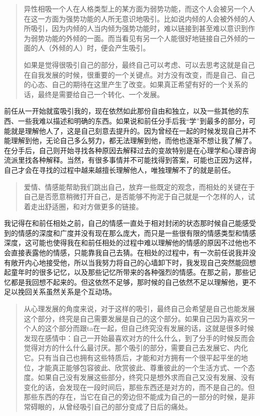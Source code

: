 \blockquote{
	异性相吸\pozhehao{}一个人在人格类型上的某方面为弱势功能，而这个人会被另一个人在这一方面为强势功能的人所无意识地吸引。比如说内倾的人会被外倾的人所吸引，因为内倾的人当内倾为强势功能时，难以链接到甚至难以意识到作为弱势功能的外倾的一面。而当看见有另一个人能很好地链接自己外倾的一面的人（外倾的人）时，便会产生吸引。

	如果是觉得很吸引自己的部分，最终自己可以考虑、可以去思考这就是自己在自我发展的时候，很重要的一个关键点。对方没有改变，而是自己、自己的心态、自己的期待在这里产生了改变。如果真正希望有好的一个关系的话，最终是需要给自己一个转化、一个发展。

}

前任从一开始就蛮吸引我的，现在依然如此\pozhehao{}那份自由和独立，以及一些其他的东西、一些我难以描述和明确的东西。如果说和前任分手后我“学”到最多的部分，可能就是理解他人了，这是自己刻意去提升的。因为曾经在一起的时候发现自己并不能理解到他，无论自己多么努力，都无法理解到他，而他也逐渐不想让我了解了。在分手后，自己则开始寻找各种原因去解释过去的变故\pozhehao{}特别是在心理学和心理咨询流派里找各种解释。当然，有很多事情并不可能找得到答案，可能也正因为这样，自己才会在寻找的过程中越来越擅长理解他人，唯独理解不了的就是前任。

\blockquote{
	爱情、情感能帮助我们跳出自己，放弃一些既定的观念，而相处的关键在于自己是否愿意稍微打开自己，是否能够不拘泥于自己就是一个怎样的人，试着走出舒适圈，和对方做更多的链接。

}

我记得在和前任相处之前，自己的情感一直处于相对封闭的状态\pozhehao{}那时候自己能感受到的情感的深度和广度并没有现在那么庞大，而只是一些很有限的情感类型和情感深度，这可能也使得我在和前任相处的过程中难以理解他的情感的原因\pozhehao{}不过他也不会直接表露他的情感，只能靠我自己去猜。在相处的过程中，有一次前任说我并没有敞开内心地接受他，所以当我努力将自己的心墙卸下时，我发现自己突然能回想起童年时的很多记忆，以及那些记忆所带来的各种强烈的情感。在那之前，那些记忆都是我回想不起来的。但这依然不足够，那时候的自己依然不足以理解他，更不足以挽回关系\pozhehao{}虽然关系是个互动场。

\blockquote{
    从心理发展的角度来说，对于这样的吸引，最终自己会希望是自己也能发展这个部分，终究是自己需要发展是自己的这个部分。如果自己因为喜欢另一个人的这个部分而跟ta在一起，但自己终究没有发展的话，这就是很多时候发现在感情中：自己一开始最喜欢对方的什么什么，到了分手的时候反而会觉得对方的什么什么最讨厌。那个吸引的部分，需要自己去发展它、内化它。只有当自己也拥有这些特质后，才能和对方拥有一个很平起平坐的地位，才能真正能够包容彼此、欣赏彼此、尊重彼此的一个生活方式、一个态度。如果自己没有发展这些部分，终究只是想外求而自己又没有发展、没有变化的话，会发现在一段时间后，那些东西还是对方的，而不是自己的。但那些东西的存在，当它在自己的旁边但不能成为自己的一部分的时候，是非常碍眼的，从曾经吸引自己的部分变成了日后的痛处。
    
}


